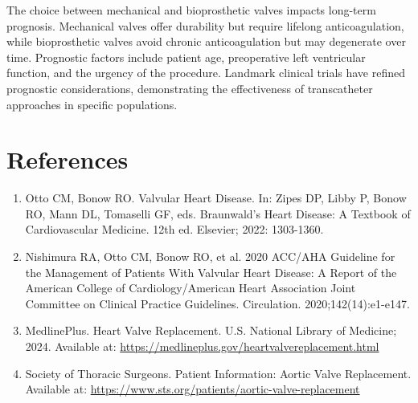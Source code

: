 The choice between mechanical and bioprosthetic valves impacts long-term prognosis. Mechanical valves offer durability but require lifelong anticoagulation, while bioprosthetic valves avoid chronic anticoagulation but may degenerate over time. Prognostic factors include patient age, preoperative left ventricular function, and the urgency of the procedure. Landmark clinical trials have refined prognostic considerations, demonstrating the effectiveness of transcatheter approaches in specific populations.

\section*{References}
\begin{enumerate}
  \item Otto CM, Bonow RO. Valvular Heart Disease. In: Zipes DP, Libby P, Bonow RO, Mann DL, Tomaselli GF, eds. Braunwald's Heart Disease: A Textbook of Cardiovascular Medicine. 12th ed. Elsevier; 2022: 1303-1360.
  
  \item Nishimura RA, Otto CM, Bonow RO, et al. 2020 ACC/AHA Guideline for the Management of Patients With Valvular Heart Disease: A Report of the American College of Cardiology/American Heart Association Joint Committee on Clinical Practice Guidelines. Circulation. 2020;142(14):e1-e147.
  
  \item MedlinePlus. Heart Valve Replacement. U.S. National Library of Medicine; 2024. Available at: \url{https://medlineplus.gov/heartvalvereplacement.html}
  
  \item Society of Thoracic Surgeons. Patient Information: Aortic Valve Replacement. Available at: \url{https://www.sts.org/patients/aortic-valve-replacement}
\end{enumerate}

\clearpage
